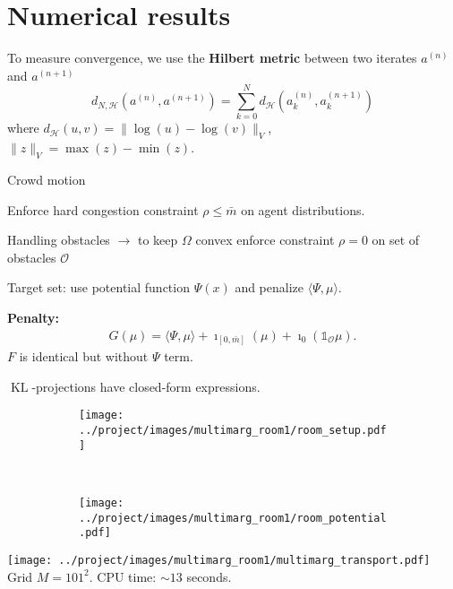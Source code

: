 \documentclass[xcolor={dvipsnames}]{beamer}
\newcommand{\calH}{\mathcal{H}}
\DeclareMathOperator{\KL}{KL}
\newcommand{\bluefont}{\color{RoyalBlue}}
\begin{document}
\section{Numerical results}

\begin{frame}
	
	To measure convergence, we use the \textbf{\bluefont Hilbert metric} between two iterates $a^{(n)}$ and $a^{(n+1)}$
	\begin{equation}
		d_{N,\calH}(a^{(n)}, a^{(n+1)}) =
		\sum_{k=0}^{N}
		d_\calH(a_k^{(n)}, a_k^{(n+1)})
	\end{equation}
	where $d_\calH(u, v) = \| \log(u) - \log(v)\|_V$, $\|z\|_V = \max(z) - \min(z)$.
\end{frame}


\begin{frame}[allowframebreaks]{Crowd motion}
	
	Enforce hard congestion constraint $\rho \leq \bar{m}$ on agent distributions.
	
	Handling obstacles $\rightarrow$ to keep $\Omega$ convex enforce constraint $\rho = 0$ on set of obstacles $\mathscr{O}$
	
	Target set: use potential function $\Psi(x)$ and penalize $\langle \Psi, \mu\rangle$.
	
	\textbf{Penalty:}
	\begin{align*}
		G(\mu) = \langle \Psi, \mu\rangle + \imath_{[0,\bar{m}]}(\mu) + \imath_0(\mathds{1}_\mathscr{O}\mu).
	\end{align*}
	$F$ is identical but without $\Psi$ term.
	
	$\KL$-projections have closed-form expressions.
	
	\framebreak
	
	\begin{figure}
		\begin{subfigure}{.45\linewidth}
			\texttt{[image: ../project/images/multimarg\_room1/room\_setup.pdf]}
		\end{subfigure}~
		\begin{subfigure}{.49\linewidth}
			\texttt{[image: ../project/images/multimarg\_room1/room\_potential.pdf]}
		\end{subfigure}
	\end{figure}
	
\end{frame}


\begin{frame}
	
	\texttt{[image: ../project/images/multimarg\_room1/multimarg\_transport.pdf]}
	Grid $M=101^2$. CPU time: $\sim 13$ seconds.
\end{frame}
\end{document}
